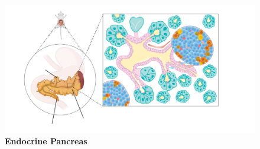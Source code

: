 \begin{figure}[ht]
\centering
\includegraphics[width=\linewidth]{Chapter1/Fig/F1-1-01.png}
\caption[sec1-1endopanc]{\textbf{Endocrine Pancreas}}
\label{fig1-1}
\end{figure}

